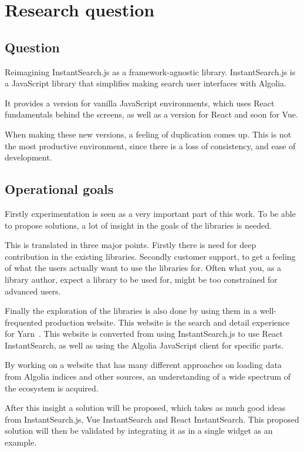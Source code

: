 
\chapter{Research question} %
\label{chp:research_question}
\section{Question}
\label{sec:question}

Reimagining InstantSearch.js as a framework-agnostic library. InstantSearch.js is a JavaScript library that simplifies making search user interfaces with Algolia. 

It provides a version for vanilla JavaScript environments, which uses React fundamentals behind the screens, as well as a version for React and soon for Vue.

When making these new versions, a feeling of duplication comes up. This is not the most productive environment, since there is a loss of consistency, and ease of development.

\section{Operational goals}
\label{sec:operational_goals}

Firstly experimentation is seen as a very important part of this work. To be able to propose solutions, a lot of insight in the goals of the libraries is needed. 

This is translated in three major points. Firstly there is need for deep contribution in the existing libraries. Secondly customer support, to get a feeling of what the users actually want to use the libraries for. Often what you, as a library author, expect a library to be used for, might be too constrained for advanced users.

Finally the exploration of the libraries is also done by using them in a well-frequented production website. This website is the search and detail experience for Yarn\cite{yarn-site}~. This website is converted from using InstantSearch.js to use React InstantSearch, as well as using the Algolia JavaScript client for specific parts.

By working on a website that has many different approaches on loading data from Algolia indices and other sources, an understanding of a wide spectrum of the ecosystem is acquired.

After this insight a solution will be proposed, which takes as much good ideas from InstantSearch.js, Vue InstantSearch and React InstantSearch. This proposed solution will then be validated by integrating it as in a single widget as an example.
